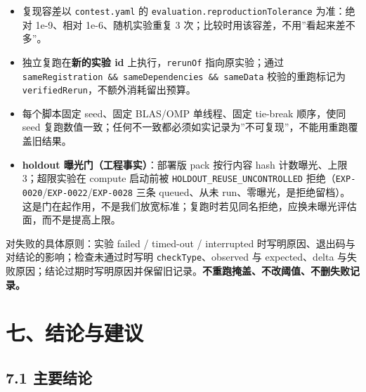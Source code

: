 \documentclass[
  11pt,
]{ctexart}
\providecommand{\tightlist}{%
  \setlength{\itemsep}{0pt}\setlength{\parskip}{0pt}}
\begin{document}
\begin{itemize}
\tightlist
\item
  复现容差以 \texttt{contest.yaml} 的
  \texttt{evaluation.\allowbreak{}reproductionTolerance} 为准：绝对 1e-9、相对
  1e-6、随机实验重复 3 次；比较时用该容差，不用''看起来差不多''。
\item
  独立复跑在\textbf{新的实验 id} 上执行，\texttt{rerunOf}
  指向原实验；通过
  \texttt{sameRegistration\ \&\&\ sameDependencies\ \&\&\ sameData}
  校验的重跑标记为 \texttt{verifiedRerun}，不额外消耗留出预算。
\item
  每个脚本固定 seed、固定 BLAS/OMP 单线程、固定 tie-break 顺序，使同
  seed
  复跑数值一致；任何不一致都必须如实记录为''不可复现''，不能用重跑覆盖旧结果。
\item
  \textbf{holdout 曝光门（工程事实）}：部署版 pack 按行内容 hash
  计数曝光、上限 3；超限实验在 compute 启动前被
  \texttt{HOLDOUT\_\allowbreak{}REUSE\_\allowbreak{}UNCONTROLLED}
  拒绝（\texttt{EXP-0020}/\texttt{EXP-0022}/\texttt{EXP-0028} 三条
  queued、从未
  run、零曝光，是拒绝留档）。这是门在起作用，不是我们放宽标准；复跑时若见同名拒绝，应换未曝光评估面，而不是提高上限。
\end{itemize}

对失败的具体原则：实验 failed / timed-out / interrupted
时写明原因、退出码与对结论的影响；检查未通过时写明
\texttt{checkType}、observed 与 expected、delta
与失败原因；结论过期时写明原因并保留旧记录。\textbf{不重跑掩盖、不改阈值、不删失败记录。}

\section{七、结论与建议}\label{ux4e03ux7ed3ux8bbaux4e0eux5efaux8bae}

\subsection{7.1 主要结论}\label{ux4e3bux8981ux7ed3ux8bba}
\end{document}
